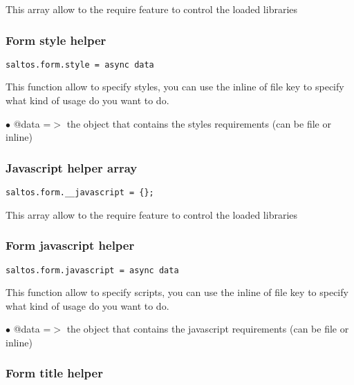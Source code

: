 \documentclass[a4paper]{article}
\begin{document}
This array allow to the require feature to control the loaded libraries

\hypertarget{toc785}{}
\subsubsection{Form style helper}

\begin{lstlisting}
saltos.form.style = async data
\end{lstlisting}

This function allow to specify styles, you can use the inline of file key to specify
what kind of usage do you want to do.

\begin{compactitem}
\item[\color{myblue}$\bullet$] @data =$>$ the object that contains the styles requirements (can be file or inline)
\end{compactitem}

\hypertarget{toc786}{}
\subsubsection{Javascript helper array}

\begin{lstlisting}
saltos.form.__javascript = {};
\end{lstlisting}

This array allow to the require feature to control the loaded libraries

\hypertarget{toc787}{}
\subsubsection{Form javascript helper}

\begin{lstlisting}
saltos.form.javascript = async data
\end{lstlisting}

This function allow to specify scripts, you can use the inline of file key to specify
what kind of usage do you want to do.

\begin{compactitem}
\item[\color{myblue}$\bullet$] @data =$>$ the object that contains the javascript requirements (can be file or inline)
\end{compactitem}

\hypertarget{toc788}{}
\subsubsection{Form title helper}
\end{document}
